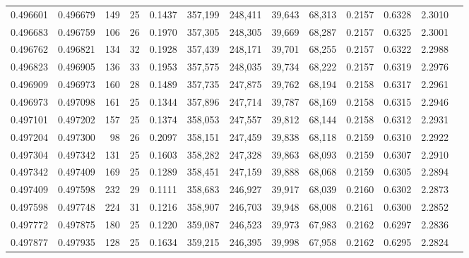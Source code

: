 \begin{tabular}{rrrrrrrrrrrrr}
0.496601 & 0.496679 & 149 &  25 &                                     0.1437 & 357,199 & 248,411 &  39,643 &  68,313 & 0.2157 & 0.6328 & 2.3010 \\
0.496683 & 0.496759 & 106 &  26 &                                     0.1970 & 357,305 & 248,305 &  39,669 &  68,287 & 0.2157 & 0.6325 & 2.3001 \\
0.496762 & 0.496821 & 134 &  32 &                                     0.1928 & 357,439 & 248,171 &  39,701 &  68,255 & 0.2157 & 0.6322 & 2.2988 \\
0.496823 & 0.496905 & 136 &  33 &                                     0.1953 & 357,575 & 248,035 &  39,734 &  68,222 & 0.2157 & 0.6319 & 2.2976 \\
0.496909 & 0.496973 & 160 &  28 &                                     0.1489 & 357,735 & 247,875 &  39,762 &  68,194 & 0.2158 & 0.6317 & 2.2961 \\
0.496973 & 0.497098 & 161 &  25 &                                     0.1344 & 357,896 & 247,714 &  39,787 &  68,169 & 0.2158 & 0.6315 & 2.2946 \\
0.497101 & 0.497202 & 157 &  25 &                                     0.1374 & 358,053 & 247,557 &  39,812 &  68,144 & 0.2158 & 0.6312 & 2.2931 \\
0.497204 & 0.497300 &  98 &  26 &                                     0.2097 & 358,151 & 247,459 &  39,838 &  68,118 & 0.2159 & 0.6310 & 2.2922 \\
0.497304 & 0.497342 & 131 &  25 &                                     0.1603 & 358,282 & 247,328 &  39,863 &  68,093 & 0.2159 & 0.6307 & 2.2910 \\
0.497342 & 0.497409 & 169 &  25 &                                     0.1289 & 358,451 & 247,159 &  39,888 &  68,068 & 0.2159 & 0.6305 & 2.2894 \\
0.497409 & 0.497598 & 232 &  29 &                                     0.1111 & 358,683 & 246,927 &  39,917 &  68,039 & 0.2160 & 0.6302 & 2.2873 \\
0.497598 & 0.497748 & 224 &  31 &                                     0.1216 & 358,907 & 246,703 &  39,948 &  68,008 & 0.2161 & 0.6300 & 2.2852 \\
0.497772 & 0.497875 & 180 &  25 &                                     0.1220 & 359,087 & 246,523 &  39,973 &  67,983 & 0.2162 & 0.6297 & 2.2836 \\
0.497877 & 0.497935 & 128 &  25 &                                     0.1634 & 359,215 & 246,395 &  39,998 &  67,958 & 0.2162 & 0.6295 & 2.2824 \\

\end{tabular}

